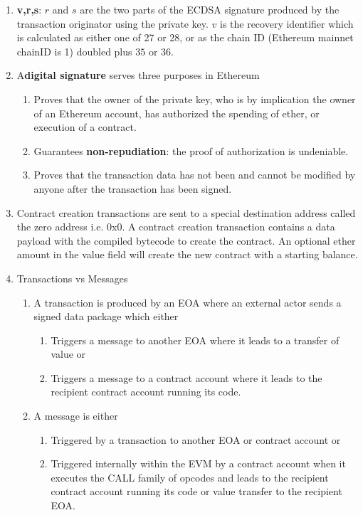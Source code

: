 \begin{enumerate}
\item\textbf{v,r,s}: $r$ and $s$ are the two parts of the ECDSA signature produced by the transaction originator using the private key. $v$ is the recovery identifier which is calculated as either one of 27 or 28, or as the chain ID (Ethereum mainnet chainID is 1) doubled plus $35$ or $36$.

\item A\textbf{digital signature} serves three purposes in Ethereum
\begin{enumerate}
\item Proves that the owner of the private key, who is by implication the owner of an Ethereum account, has authorized the spending of ether, or execution of a contract.
\item Guarantees \textbf{non-repudiation}: the proof of authorization is undeniable.
\item Proves that the transaction data has not been and cannot be modified by anyone after the transaction has been signed.
\end{enumerate}

\item Contract creation transactions are sent to a special destination address called the zero address i.e. 0x0. A contract creation transaction contains a data payload with the compiled bytecode to create the contract. An optional ether amount in the value field will create the new contract with a starting balance.

\item Transactions vs Messages
\begin{enumerate}
\item A transaction is produced by an EOA where an external actor sends a signed data package which either
\begin{enumerate}
\item Triggers a message to another EOA where it leads to a transfer of value or
\item Triggers a message to a contract account where it leads to the recipient contract account running its code.
\end{enumerate}
\item A message is either
\begin{enumerate}
\item Triggered by a transaction to another EOA or contract account or
\item Triggered internally within the EVM by a contract account when it executes the CALL family of opcodes and leads to the recipient contract account running its code or value transfer to the recipient EOA.
\end{enumerate}
\end{enumerate}


\end{enumerate}
